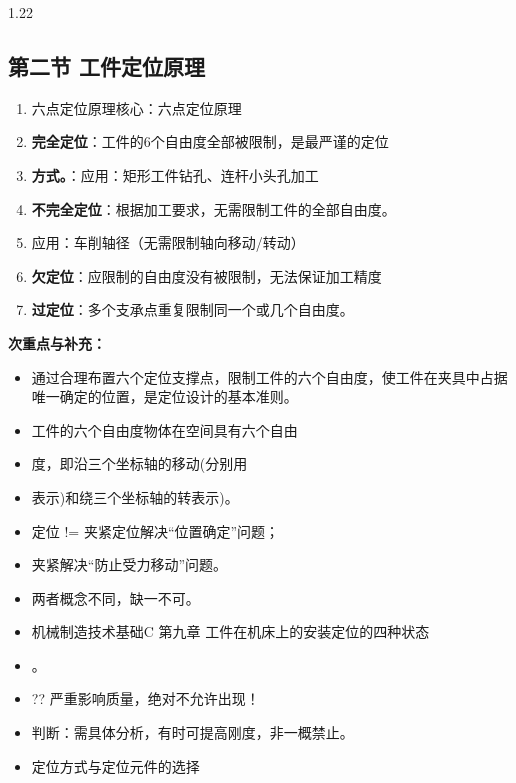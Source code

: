 \documentclass[12pt,a4paper]{article}
\begin{document}
\begin{spacing}{1.22}
\subsection{第二节 工件定位原理}
\begin{tcolorbox}[colback=yellow!6,colframe=red!55!black,title=重点,left=1mm,right=1mm]
\begin{enumerate}[leftmargin=2.2em,label=\arabic*.]
  \item 六点定位原理核心：六点定位原理
  \item \textbf{完全定位}：工件的6个自由度全部被限制，是最严谨的定位
  \item \textbf{方式。}：应用：矩形工件钻孔、连杆小头孔加工
  \item \textbf{不完全定位}：根据加工要求，无需限制工件的全部自由度。
  \item 应用：车削轴径（无需限制轴向移动/转动）
  \item \textbf{欠定位}：应限制的自由度没有被限制，无法保证加工精度
  \item \textbf{过定位}：多个支承点重复限制同一个或几个自由度。
\end{enumerate}
\end{tcolorbox}
\noindent\textbf{次重点与补充：}
\begin{itemize}[leftmargin=2.2em,label=--]
  \item 通过合理布置六个定位支撑点，限制工件的六个自由度，使工件在夹具中占据唯一确定的位置，是定位设计的基本准则。
  \item 工件的六个自由度物体在空间具有六个自由
  \item 度，即沿三个坐标轴的移动(分别用
  \item 表示)和绕三个坐标轴的转表示)。
  \item 定位 != 夹紧定位解决“位置确定”问题；
  \item 夹紧解决“防止受力移动”问题。
  \item 两者概念不同，缺一不可。
  \item 机械制造技术基础C 第九章 工件在机床上的安装定位的四种状态
  \item 。
  \item ?? 严重影响质量，绝对不允许出现！
  \item 判断：需具体分析，有时可提高刚度，非一概禁止。
  \item 定位方式与定位元件的选择
\end{itemize}


\end{spacing}
\end{document}
